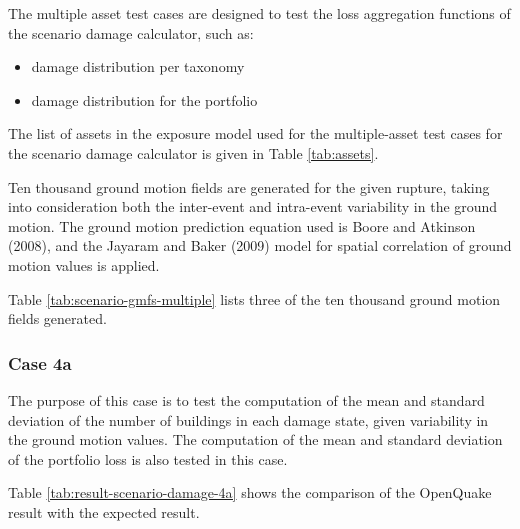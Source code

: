 The multiple asset test cases are designed to test the loss aggregation functions of the scenario damage calculator, such as:

\begin{itemize}
\item damage distribution per taxonomy
\item damage distribution for the portfolio
\end{itemize}

The list of assets in the exposure model used for the multiple-asset test cases for the scenario damage calculator is given in Table \ref{tab:assets}.

Ten thousand ground motion fields are generated for the given rupture, taking into consideration both the inter-event and intra-event variability in the ground motion. The ground motion prediction equation used is Boore and Atkinson (2008), and the Jayaram and Baker (2009) model for spatial correlation of ground motion values is applied.



Table \ref{tab:scenario-gmfs-multiple} lists three of the ten thousand ground motion fields generated.

\subsubsection{Case 4a}
The purpose of this case is to test the computation of the mean and standard deviation of the number of buildings in each damage state, given variability in the ground motion values. The computation of the mean and standard deviation of the portfolio loss is also tested in this case.



Table \ref{tab:result-scenario-damage-4a} shows the comparison of the OpenQuake result with the expected result.

